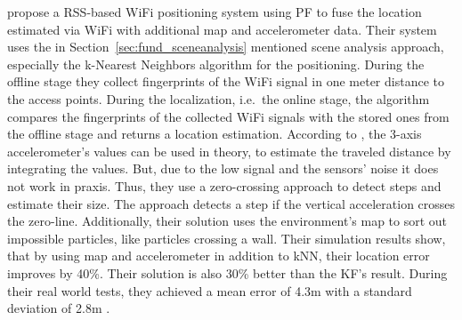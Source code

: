 \citet{wang:wlan} propose a \ac{RSS}-based WiFi positioning system using \ac{PF} to fuse the location estimated via WiFi with additional map and accelerometer data. Their system uses the in Section~\ref{sec:fund_sceneanalysis} mentioned scene analysis approach, especially the k-Nearest Neighbors algorithm for the positioning. During the offline stage they collect fingerprints of the WiFi signal in one meter distance to the access points. During the localization, i.e.\ the online stage, the algorithm compares the fingerprints of the collected WiFi signals with the stored ones from the offline stage and returns a location estimation. According to \citet{wang:wlan}, the 3-axis accelerometer's values can be used in theory, to estimate the traveled distance by integrating the values. But, due to the low signal and the sensors' noise it does not work in praxis. Thus, they use a zero-crossing approach to detect steps and estimate their size. The approach detects a step if the vertical acceleration crosses the zero-line. Additionally, their solution uses the environment's map to sort out impossible particles, like particles crossing a wall.
Their simulation results show, that by using map and accelerometer in addition to kNN, their location error improves by 40\%. Their solution is also 30\% better than the \ac{KF}'s result. During their real world tests, they achieved a mean error of 4.3m with a standard deviation of 2.8m \citep{wang:wlan}.

